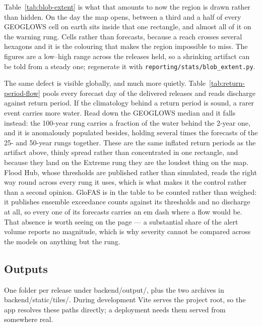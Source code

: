 Table~\ref{tab:blob-extent} is what that amounts to now the region is drawn rather than hidden.
On the day the map opens, between a third and a half of every GEOGLOWS cell on earth sits inside that one rectangle, and almost all of it on the warning rung.
Cells rather than forecasts, because a reach crosses several hexagons and it is the colouring that makes the region impossible to miss.
The figures are a low--high range across the releases held, so a shrinking artifact can be told from a steady one; regenerate it with \texttt{reporting/stats/blob\_extent.py}.



The same defect is visible globally, and much more quietly.
Table~\ref{tab:return-period-flow} pools every forecast day of the delivered releases and reads discharge against return period.
If the climatology behind a return period is sound, a rarer event carries more water.
Read down the GEOGLOWS median and it falls instead: the 100-year rung carries a fraction of the water behind the 2-year one, and it is anomalously populated besides, holding several times the forecasts of the 25- and 50-year rungs together.
These are the same inflated return periods as the artifact above, thinly spread rather than concentrated in one rectangle, and because they land on the Extreme rung they are the loudest thing on the map.
Flood Hub, whose thresholds are published rather than simulated, reads the right way round across every rung it uses, which is what makes it the control rather than a second opinion.
GloFAS is in the table to be counted rather than weighed: it publishes ensemble exceedance counts against its thresholds and no discharge at all, so every one of its forecasts carries an em dash where a flow would be.
That absence is worth seeing on the page --- a substantial share of the alert volume reports no magnitude, which is why severity cannot be compared across the models on anything but the rung.



\subsection{Outputs}\label{outputs}

One folder per release under backend/output/, plus the two archives in backend/static/tiles/.
During development Vite serves the project root, so the app resolves these paths directly; a deployment needs them served from somewhere real.

